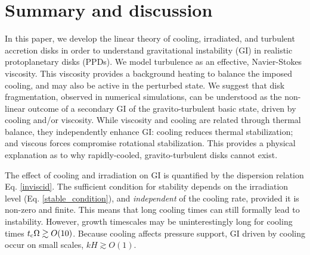 \section{Summary and discussion}\label{summary}
In this paper, we develop the linear theory of cooling, irradiated,
and turbulent accretion disks in order to understand gravitational
instability (GI) in realistic protoplanetary disks (PPDs). 
We model turbulence as an effective, 
Navier-Stokes viscosity. This viscosity provides a 
background heating to balance the imposed cooling,  
and may also be active in the perturbed state.  
We suggest that disk fragmentation, observed in numerical simulations,
can be understood as the non-linear outcome of a secondary
GI of the gravito-turbulent basic state, driven by cooling and/or viscosity.   
While viscosity and cooling are related through thermal
balance, they independently enhance GI: cooling reduces thermal
stabilization; and viscous forces compromise rotational
stabilization. This provides a physical explanation as to why
rapidly-cooled, gravito-turbulent disks cannot exist. 


The effect of cooling and irradiation on GI is quantified by the
dispersion relation 
Eq. \ref{inviscid}. The sufficient condition for stability 
depends on the irradiation level (Eq. \ref{stable_condition}), and 
\emph{independent} of the cooling rate, provided it is non-zero and
finite. This means that long cooling times can still  
formally lead to instability. However, growth timescales may be 
uninterestingly long for cooling times $t_\mathrm{c}\Omega\gtrsim
O(10)$. Because cooling affects pressure support, GI driven by cooling
occur on small scales, $kH\gtrsim O(1)$.   


